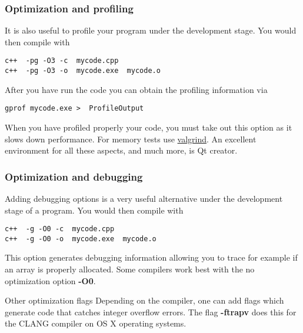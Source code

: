 \documentclass{beamer}
\begin{document}
\begin{frame}
\frametitle{Optimization and profiling}

\begin{block}{}
It is also useful to profile your program under the development stage.
You would then compile with 



\begin{verbatim}
c++  -pg -O3 -c  mycode.cpp
c++  -pg -O3 -o  mycode.exe  mycode.o

\end{verbatim}

After you have run the code you can obtain the profiling information via


\begin{verbatim}
gprof mycode.exe >  ProfileOutput

\end{verbatim}

When you have profiled properly your code, you must take out this option as it 
slows down performance.
For memory tests use \href{{http://www.valgrind.org}}{valgrind}. An excellent environment for all these aspects, and much  more, is  Qt creator.

\end{block}
\end{frame}

\begin{frame}
\frametitle{Optimization and debugging}

\begin{block}{}
Adding debugging options is a very useful alternative under the development stage of a program.
You would then compile with 



\begin{verbatim}
c++  -g -O0 -c  mycode.cpp
c++  -g -O0 -o  mycode.exe  mycode.o

\end{verbatim}

This option generates debugging information allowing you to trace for example if an array is properly allocated. Some compilers work best with the no optimization option \textbf{-O0}. 
\end{block}
\begin{block}{Other optimization flags  }
Depending on the compiler, one can add flags which generate code that catches integer overflow errors. 
The flag \textbf{-ftrapv} does this for the CLANG compiler on OS X operating systems.   
\end{block}
\end{frame}
\end{document}
